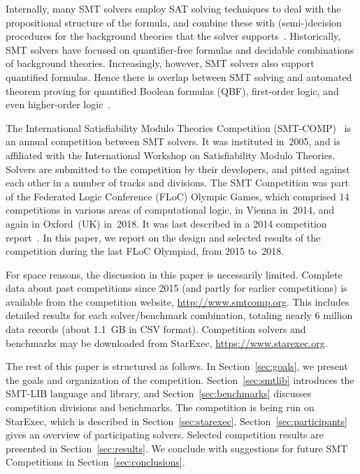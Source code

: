 \documentclass[dvipsnames,table,twoside,11pt]{article}
\begin{document}
Internally, many SMT solvers employ SAT solving techniques to deal
with the propositional structure of the formula, and combine these
with (semi-)decision procedures for the background theories that the
solver
supports~\cite{DBLP:conf/cav/BarrettCDHJKRT11,DBLP:conf/cade/BoutonODF09,DBLP:conf/tacas/MouraB08,Nieuwenhuis:2006:SSS:1217856.1217859}.
Historically, SMT solvers have focused on quantifier-free formulas and
decidable combinations of background theories.  Increasingly, however,
SMT solvers also support quantified formulas.  Hence there is overlap
between SMT solving and automated theorem proving for quantified
Boolean formulas (QBF), first-order logic, and even higher-order
logic~\cite{DBLP:journals/corr/abs-1712-01486}.

The International Satisfiability Modulo Theories Competition
(SMT-COMP)~\cite{BdMS05,BdMS07,BDdMOS13,BDOS08,BDOS10,CDW14,CGBD12} is
an annual competition between SMT solvers.  It was instituted in~2005,
and is affiliated with the International Workshop on Satisfiability
Modulo Theories.  Solvers are submitted to the competition by their
developers, and pitted against each other in a number of tracks and
divisions.  The SMT Competition was part of the Federated Logic
Conference (FLoC) Olympic Games, which comprised 14 competitions in
various areas of computational logic, in Vienna in~2014, and again in
Oxford~(UK) in~2018.  It was last described in a 2014 competition
report~\cite{CDW14}.  In this paper, we report on the design and
selected results of the competition during the last FLoC Olympiad,
from 2015 to~2018.

For space reasons, the discussion in this paper is necessarily
limited.  Complete data about past competitions since 2015 (and partly
for earlier competitions) is available from the competition website,
\url{http://www.smtcomp.org}.  This includes detailed results for each
solver/benchmark combination, totaling nearly 6 million data records
(about 1.1~GB in CSV format).  Competition solvers and benchmarks may
be downloaded from StarExec, \url{https://www.starexec.org}.

The rest of this paper is structured as follows.  In
Section~\ref{sec:goals}, we present the goals and organization of the
competition.  Section~\ref{sec:smtlib} introduces the SMT-LIB language
and library, and Section~\ref{sec:benchmarks} discusses competition
divisions and benchmarks.  The competition is being run on StarExec,
which is described in Section~\ref{sec:starexec}.
Section~\ref{sec:participants} gives an overview of participating
solvers.  Selected competition results are presented in
Section~\ref{sec:results}.  We conclude with suggestions for future
SMT Competitions in Section~\ref{sec:conclusions}.
\end{document}
